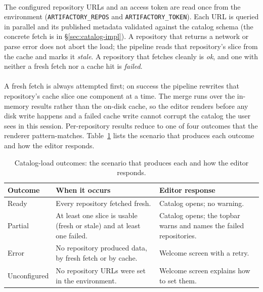 \paragraph{}
The configured repository URLs and an access token are read once from the environment (\texttt{ARTIFACTORY\_REPOS} and \texttt{ARTIFACTORY\_TOKEN}). Each URL is queried in parallel and its published metadata validated against the catalog schema (the concrete fetch is in \S\ref{sec:catalog-impl}). A repository that returns a network or parse error does not abort the load; the pipeline reads that repository's slice from the cache and marks it \textit{stale}. A repository that fetches cleanly is \textit{ok}, and one with neither a fresh fetch nor a cache hit is \textit{failed}.

\paragraph{}
A fresh fetch is always attempted first; on success the pipeline rewrites that repository's cache slice one component at a time. The merge runs over the in-memory results rather than the on-disk cache, so the editor renders before any disk write happens and a failed cache write cannot corrupt the catalog the user sees in this session. Per-repository results reduce to one of four outcomes that the renderer pattern-matches. Table~\ref{tab:catalog-outcomes} lists the scenario that produces each outcome and how the editor responds.

\begin{table}[H]
\centering
\caption[Catalog-load outcomes and the editor's response.]{Catalog-load outcomes: the scenario that produces each and how the editor responds.}
\label{tab:catalog-outcomes}
\footnotesize
\begin{tabular}{l p{5.4cm} p{4.6cm}}
\toprule
\textbf{Outcome} & \textbf{When it occurs} & \textbf{Editor response} \\
\midrule
Ready        & Every repository fetched fresh.                                          & Catalog opens; no warning. \\
Partial      & At least one slice is usable (fresh or stale) and at least one failed.    & Catalog opens; the topbar warns and names the failed repositories. \\
Error        & No repository produced data, by fresh fetch or by cache.                  & Welcome screen with a retry. \\
Unconfigured & No repository URLs were set in the environment.                          & Welcome screen explains how to set them. \\
\bottomrule
\end{tabular}
\end{table}


